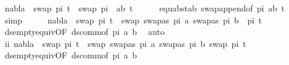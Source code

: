 \begin{isabellebody}
\ {\isachardoublequoteopen}nabla\ {\isasymturnstile}\ swap\ pi\ t{}{\isacharprime}{\kern0pt}\ {\isasymapprox}\ swap\ {\isacharparenleft}{\kern0pt}pi\ {\isacharat}{\kern0pt}\ {\isacharbrackleft}{\kern0pt}{\isacharparenleft}{\kern0pt}a{\isacharcomma}{\kern0pt}b{\isacharparenright}{\kern0pt}{\isacharbrackright}{\kern0pt}{\isacharparenright}{\kern0pt}\ t{}{\isacharprime}{\kern0pt}{\isachardoublequoteclose}\isanewline
\ \ \ \ \isamarkupfalse%
\ equ{\isacharunderscore}{\kern0pt}abst{\isacharunderscore}{\kern0pt}ab{\isacharparenleft}{\kern0pt}{}{\isacharparenright}{\kern0pt}\ swap{\isacharunderscore}{\kern0pt}append{\isacharbrackleft}{\kern0pt}of\ pi\ {\isacartoucheopen}{\isacharbrackleft}{\kern0pt}{\isacharparenleft}{\kern0pt}a{\isacharcomma}{\kern0pt}b{\isacharparenright}{\kern0pt}{\isacharbrackright}{\kern0pt}{\isacartoucheclose}\ t{}{\isacharprime}{\kern0pt}{\isacharbrackright}{\kern0pt}\ \isamarkupfalse%
\ simp\isanewline
\ \ \isamarkupfalse%
\ \isamarkupfalse%
\ {\isachardoublequoteopen}nabla\ {\isasymturnstile}\ swap\ pi\ t{}{\isacharprime}{\kern0pt}\ {\isasymapprox}\ swap\ {\isacharparenleft}{\kern0pt}{\isacharbrackleft}{\kern0pt}{\isacharparenleft}{\kern0pt}swapas\ pi\ a{\isacharcomma}{\kern0pt}\ swapas\ pi\ b{\isacharparenright}{\kern0pt}{\isacharbrackright}{\kern0pt}\ {\isacharat}{\kern0pt}\ pi{\isacharparenright}{\kern0pt}\ t{}{\isacharprime}{\kern0pt}{\isachardoublequoteclose}\isanewline
\ \ \ \ \isamarkupfalse%
\ ds{\isacharunderscore}{\kern0pt}empty{\isacharunderscore}{\kern0pt}equiv{\isacharunderscore}{\kern0pt}{}{\isacharbrackleft}{\kern0pt}OF\ ds{\isacharunderscore}{\kern0pt}comm{\isacharbrackleft}{\kern0pt}of\ pi\ a\ b{\isacharbrackright}{\kern0pt}{\isacharbrackright}{\kern0pt}\ \isamarkupfalse%
\ auto\isanewline
\ \ \isamarkupfalse%
\ \isamarkupfalse%
\ ii{\isacharcolon}{\kern0pt}\ {\isachardoublequoteopen}nabla\ {\isasymturnstile}\ swap\ pi\ t{}{\isacharprime}{\kern0pt}\ {\isasymapprox}\ swap\ {\isacharbrackleft}{\kern0pt}{\isacharparenleft}{\kern0pt}swapas\ pi\ a{\isacharcomma}{\kern0pt}\ swapas\ pi\ b{\isacharparenright}{\kern0pt}{\isacharbrackright}{\kern0pt}\ {\isacharparenleft}{\kern0pt}swap\ pi\ t{}{\isacharprime}{\kern0pt}{\isacharparenright}{\kern0pt}{\isachardoublequoteclose}\isanewline
\ \ \ \ \isamarkupfalse%
\ ds{\isacharunderscore}{\kern0pt}empty{\isacharunderscore}{\kern0pt}equiv{\isacharunderscore}{\kern0pt}{}{\isacharbrackleft}{\kern0pt}OF\ ds{\isacharunderscore}{\kern0pt}comm{\isacharbrackleft}{\kern0pt}of\ pi\ a\ b{\isacharbrackright}{\kern0pt}{\isacharbrackright}{\kern0pt}\ \isanewline

\end{isabellebody}
